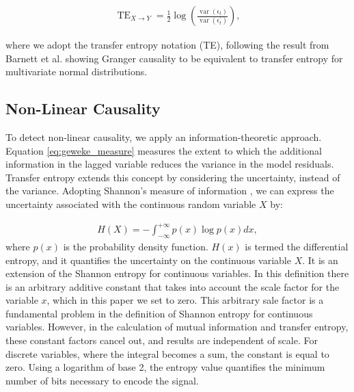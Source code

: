 \documentclass[]{rsos}%
\begin{document}
  \begin{eqnarray}
    \label{eq:geweke_measure}
    \operatorname{TE}_{X\rightarrow Y} = \frac12\log \left(
      \frac{\operatorname{var}(\epsilon_t)}
          {\operatorname{var}(\epsilon^{\prime}_t)}
  \right) ,
  \end{eqnarray}

    where we adopt the transfer entropy notation (TE), following the result from Barnett et al. \cite{barnett2009granger} showing Granger causality to be equivalent to transfer entropy for multivariate normal distributions.

  \subsection{Non-Linear Causality}

  To detect non-linear causality, we apply an information-theoretic approach. Equation \ref{eq:geweke_measure} measures the extent to which the additional information in the lagged variable reduces the variance in the model residuals. Transfer entropy extends this concept by considering the uncertainty, instead of the variance. Adopting Shannon's measure of information \cite{shannon1948}, we can express the uncertainty associated with the continuous random variable $X$ by:

  \begin{eqnarray}
    \label{eq:entropy}
    H(X) = - \int_{-\infty}^{+\infty}  { p(x) \log{p(x)}  } dx,
  \end{eqnarray}
where $p(x)$ is the probability density function.   
$H(x)$ is termed the differential entropy, and it quantifies the uncertainty on the continuous variable $X$. It is an extension of the Shannon entropy for continuous variables. 
In this definition there is an arbitrary additive constant that takes into account the scale factor for the variable $x$, which in this paper we set to zero.
This arbitrary sale factor is a fundamental problem in the definition of Shannon entropy for continuous variables. 
However, in the calculation of mutual information and  transfer entropy, these constant factors cancel out, and results are independent of scale.
For discrete variables, where the integral becomes a sum, the constant is equal to zero. Using a logarithm of base 2, the entropy value quantifies the minimum number of bits necessary to encode the signal. 
\end{document}
